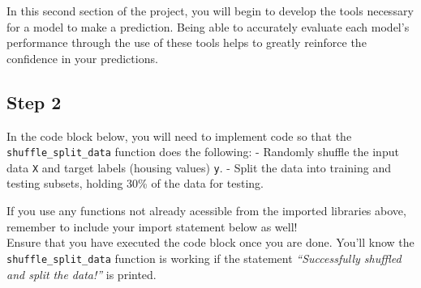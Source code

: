 \documentclass{article}
\begin{document}
In this second section of the project, you will begin to develop the
tools necessary for a model to make a prediction. Being able to
accurately evaluate each model's performance through the use of these
tools helps to greatly reinforce the confidence in your predictions.

    \subsection{Step 2}\label{step-2}

In the code block below, you will need to implement code so that the
\texttt{shuffle\_split\_data} function does the following: - Randomly
shuffle the input data \texttt{X} and target labels (housing values)
\texttt{y}. - Split the data into training and testing subsets, holding
30\% of the data for testing.

If you use any functions not already acessible from the imported
libraries above, remember to include your import statement below as
well!\\
Ensure that you have executed the code block once you are done. You'll
know the \texttt{shuffle\_split\_data} function is working if the
statement \emph{``Successfully shuffled and split the data!''} is
printed.
\end{document}
